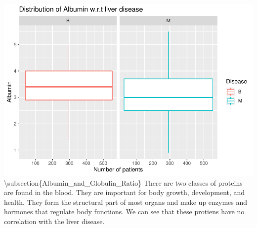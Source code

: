 \documentclass[]{article}
\newenvironment{Shaded}{\begin{snugshade}}{\end{snugshade}}
\newcommand{\CommentTok}[1]{\textcolor[rgb]{0.56,0.35,0.01}{\textit{#1}}}
\newcommand{\DataTypeTok}[1]{\textcolor[rgb]{0.13,0.29,0.53}{#1}}
\newcommand{\KeywordTok}[1]{\textcolor[rgb]{0.13,0.29,0.53}{\textbf{#1}}}
\newcommand{\NormalTok}[1]{#1}
\newcommand{\OperatorTok}[1]{\textcolor[rgb]{0.81,0.36,0.00}{\textbf{#1}}}
\newcommand{\StringTok}[1]{\textcolor[rgb]{0.31,0.60,0.02}{#1}}
\begin{document}
\begin{Shaded}
\end{Shaded}

\includegraphics{LiverDisease_files/figure-latex/unnamed-chunk-16-1.pdf}
\textbackslash subsection\{Albumin\_and\_Globulin\_Ratio\} There are two
classes of proteins are found in the blood. They are important for body
growth, development, and health. They form the structural part of most
organs and make up enzymes and hormones that regulate body functions. We
can see that these protiens have no correlation with the liver disease.
\end{document}
